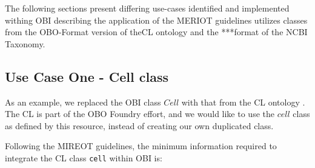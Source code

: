\documentclass[a4paper,10pt,twocolumn]{article}
\begin{document}
The following sections present differing use-cases identified and implemented withing OBI describing the application of the MERIOT guidelines utilizes classes from the \ac{OBO}-Format version of the\ac{CL} ontology and the ***format of the NCBI Taxonomy.



\subsection*{Use Case One - Cell class}

As an example, we replaced the \ac{OBI} class $Cell$ with that from the \ac{CL} ontology \cite{RefWorks:1559}. %
The \ac{CL} is part of the \ac{OBO} Foundry effort, and we would like to use the $cell$ class as defined by this resource, instead of creating our own duplicated class.













Following the MIREOT guidelines, the minimum information required to integrate the \ac{CL} class \texttt{cell} within OBI is:  
\end{document}
